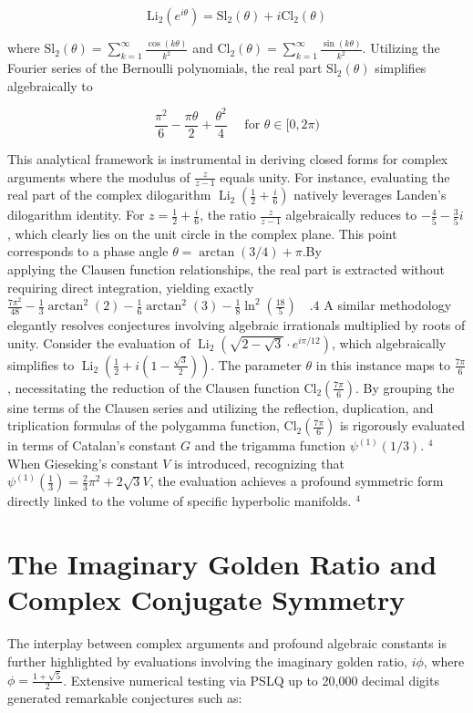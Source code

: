 \documentclass[10pt]{article}
\begin{document}
$$
\mathrm{Li}_{2}\left(e^{i \theta}\right)=\mathrm{Sl}_{2}(\theta)+i \mathrm{Cl}_{2}(\theta)
$$

where $\mathrm{Sl}_{2}(\theta)=\sum_{k=1}^{\infty} \frac{\cos (k \theta)}{k^{2}}$ and $\mathrm{Cl}_{2}(\theta)=\sum_{k=1}^{\infty} \frac{\sin (k \theta)}{k^{2}}$. Utilizing the Fourier series of the Bernoulli polynomials, the real part $\mathrm{Sl}_{2}(\theta)$ simplifies algebraically to

$$
\frac{\pi^{2}}{6}-\frac{\pi \theta}{2}+\frac{\theta^{2}}{4} \quad \text { for } \theta \in[0,2 \pi)
$$

This analytical framework is instrumental in deriving closed forms for complex arguments where the modulus of $\frac{z}{z-1}$ equals unity. For instance, evaluating the real part of the complex dilogarithm $\operatorname{Li}_{2}\left(\frac{1}{2}+\frac{i}{6}\right)$ natively leverages Landen's dilogarithm identity. For $z=\frac{1}{2}+\frac{i}{6}$, the ratio $\frac{z}{z-1}$ algebraically reduces to $-\frac{4}{5}-\frac{3}{5} i$, which clearly lies on the unit circle in the complex plane. This point corresponds to a phase angle $\theta=\arctan (3 / 4)+\pi$.By\\
applying the Clausen function relationships, the real part is extracted without requiring direct integration, yielding exactly $\frac{7 \pi^{2}}{48}-\frac{1}{3} \arctan ^{2}(2)-\frac{1}{6} \arctan ^{2}(3)-\frac{1}{8} \ln ^{2}\left(\frac{18}{5}\right) \quad .4$ A similar methodology elegantly resolves conjectures involving algebraic irrationals multiplied by roots of unity. Consider the evaluation of $\operatorname{Li}_{2}\left(\sqrt{2-\sqrt{3}} \cdot e^{i \pi / 12}\right)$, which algebraically simplifies to $\operatorname{Li}_{2}\left(\frac{1}{2}+i\left(1-\frac{\sqrt{3}}{2}\right)\right)$. The parameter $\theta$ in this instance maps to $\frac{7 \pi}{6}$, necessitating the reduction of the Clausen function $\mathrm{Cl}_{2}\left(\frac{7 \pi}{6}\right)$. By grouping the sine terms of the Clausen series and utilizing the reflection, duplication, and triplication formulas of the polygamma function, $\mathrm{Cl}_{2}\left(\frac{7 \pi}{6}\right)$ is rigorously evaluated in terms of Catalan's constant $G$ and the trigamma function $\psi^{(1)}(1 / 3)$. ${ }^{4}$ When Gieseking's constant $V$ is introduced, recognizing that $\psi^{(1)}\left(\frac{1}{3}\right)=\frac{2}{3} \pi^{2}+2 \sqrt{3} V$, the evaluation achieves a profound symmetric form directly linked to the volume of specific hyperbolic manifolds. ${ }^{4}$

\section*{The Imaginary Golden Ratio and Complex Conjugate Symmetry}
The interplay between complex arguments and profound algebraic constants is further highlighted by evaluations involving the imaginary golden ratio, $i \phi$, where $\phi=\frac{1+\sqrt{5}}{2}$. Extensive numerical testing via PSLQ up to 20,000 decimal digits generated remarkable conjectures such as:
\end{document}

